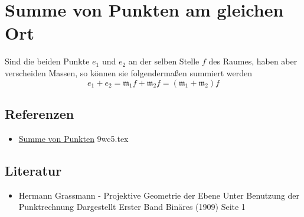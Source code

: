 \documentclass{sajzk}
\begin{document}
\section{Summe von Punkten am gleichen Ort}
\label{1l47}

Sind die beiden Punkte $e_1$ und $e_2$ an der selben Stelle $f$ des Raumes,
haben aber verscheiden Massen, so können sie folgendermaßen summiert werden
$$e_1 + e_2 = \mathfrak{m}_1f + \mathfrak{m}_2f = (\mathfrak{m}_1 + \mathfrak{m}_2)f$$

\subsection{Referenzen}
\begin{itemize}
    \item \href{9wc5}{Summe von Punkten} 9wc5.tex
\end{itemize}

\subsection{Literatur}
\begin{itemize}
    \item Hermann Grassmann - Projektive Geometrie der Ebene Unter Benutzung der Punktrechnung Dargestellt Erster Band Binäres (1909) Seite 1
\end{itemize}
\end{document}
